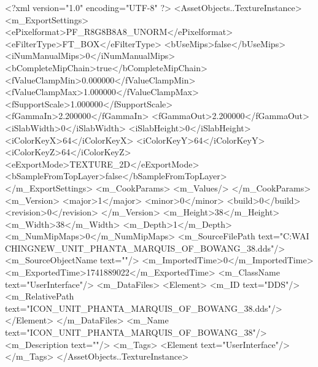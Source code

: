 <?xml version="1.0" encoding="UTF-8" ?>
<AssetObjects..TextureInstance>
	<m_ExportSettings>
		<ePixelformat>PF_R8G8B8A8_UNORM</ePixelformat>
		<eFilterType>FT_BOX</eFilterType>
		<bUseMips>false</bUseMips>
		<iNumManualMips>0</iNumManualMips>
		<bCompleteMipChain>true</bCompleteMipChain>
		<fValueClampMin>0.000000</fValueClampMin>
		<fValueClampMax>1.000000</fValueClampMax>
		<fSupportScale>1.000000</fSupportScale>
		<fGammaIn>2.200000</fGammaIn>
		<fGammaOut>2.200000</fGammaOut>
		<iSlabWidth>0</iSlabWidth>
		<iSlabHeight>0</iSlabHeight>
		<iColorKeyX>64</iColorKeyX>
		<iColorKeyY>64</iColorKeyY>
		<iColorKeyZ>64</iColorKeyZ>
		<eExportMode>TEXTURE_2D</eExportMode>
		<bSampleFromTopLayer>false</bSampleFromTopLayer>
	</m_ExportSettings>
	<m_CookParams>
		<m_Values/>
	</m_CookParams>
	<m_Version>
		<major>1</major>
		<minor>0</minor>
		<build>0</build>
		<revision>0</revision>
	</m_Version>
	<m_Height>38</m_Height>
	<m_Width>38</m_Width>
	<m_Depth>1</m_Depth>
	<m_NumMipMaps>0</m_NumMipMaps>
	<m_SourceFilePath text="C:\Users\YANG WAI CHING\Downloads\CIV\DDS NEW\ICON_UNIT_PHANTA_MARQUIS_OF_BOWANG_38.dds"/>
	<m_SourceObjectName text=""/>
	<m_ImportedTime>0</m_ImportedTime>
	<m_ExportedTime>1741889022</m_ExportedTime>
	<m_ClassName text="UserInterface"/>
	<m_DataFiles>
		<Element>
			<m_ID text="DDS"/>
			<m_RelativePath text="ICON_UNIT_PHANTA_MARQUIS_OF_BOWANG_38.dds"/>
		</Element>
	</m_DataFiles>
	<m_Name text="ICON_UNIT_PHANTA_MARQUIS_OF_BOWANG_38"/>
	<m_Description text=""/>
	<m_Tags>
		<Element text="UserInterface"/>
	</m_Tags>
</AssetObjects..TextureInstance>

